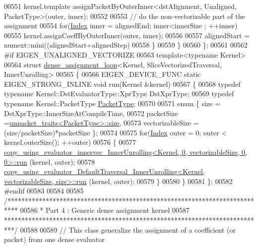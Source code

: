 \begin{DoxyCode}
00551         kernel.template assignPacketByOuterInner<dstAlignment, Unaligned, PacketType>(outer, inner);
00552 
00553       \textcolor{comment}{// do the non-vectorizable part of the assignment}
00554       \textcolor{keywordflow}{for}(\hyperlink{namespace_eigen_a62e77e0933482dafde8fe197d9a2cfde}{Index} inner = alignedEnd; inner<innerSize ; ++inner)
00555         kernel.assignCoeffByOuterInner(outer, inner);
00556 
00557       alignedStart = numext::mini((alignedStart+alignedStep)%
00558     \}
00559   \}
00560 \};
00561 
00562 \textcolor{preprocessor}{#if EIGEN\_UNALIGNED\_VECTORIZE}
00563 \textcolor{keyword}{template}<\textcolor{keyword}{typename} Kernel>
00564 \textcolor{keyword}{struct }\hyperlink{struct_eigen_1_1internal_1_1dense__assignment__loop}{dense\_assignment\_loop}<Kernel, SliceVectorizedTraversal, InnerUnrolling>
00565 \{
00566   EIGEN\_DEVICE\_FUNC \textcolor{keyword}{static} EIGEN\_STRONG\_INLINE \textcolor{keywordtype}{void} run(Kernel &kernel)
00567   \{
00568     \textcolor{keyword}{typedef} \textcolor{keyword}{typename} Kernel::DstEvaluatorType::XprType DstXprType;
00569     \textcolor{keyword}{typedef} \textcolor{keyword}{typename} Kernel::PacketType \hyperlink{struct_eigen_1_1_packet_type}{PacketType};
00570 
00571     \textcolor{keyword}{enum} \{ size = DstXprType::InnerSizeAtCompileTime,
00572            packetSize =\hyperlink{struct_eigen_1_1internal_1_1unpacket__traits}{unpacket\_traits<PacketType>::size},
00573            vectorizableSize = (size/packetSize)*packetSize \};
00574 
00575     \textcolor{keywordflow}{for}(\hyperlink{namespace_eigen_a62e77e0933482dafde8fe197d9a2cfde}{Index} outer = 0; outer < kernel.outerSize(); ++outer)
00576     \{
00577       
      \hyperlink{struct_eigen_1_1internal_1_1copy__using__evaluator__innervec___inner_unrolling}{copy\_using\_evaluator\_innervec\_InnerUnrolling<Kernel, 0, vectorizableSize, 0, 0>::run}
      (kernel, outer);
00578       
      \hyperlink{struct_eigen_1_1internal_1_1copy__using__evaluator___default_traversal___inner_unrolling}{copy\_using\_evaluator\_DefaultTraversal\_InnerUnrolling<Kernel, vectorizableSize, size>::run}
      (kernel, outer);
00579     \}
00580   \}
00581 \};
00582 \textcolor{preprocessor}{#endif}
00583 
00584 
00585 \textcolor{comment}{/***************************************************************************}
00586 \textcolor{comment}{* Part 4 : Generic dense assignment kernel}
00587 \textcolor{comment}{***************************************************************************/}
00588 
00589 \textcolor{comment}{// This class generalize the assignment of a coefficient (or packet) from one dense evaluator}

\end{DoxyCode}
